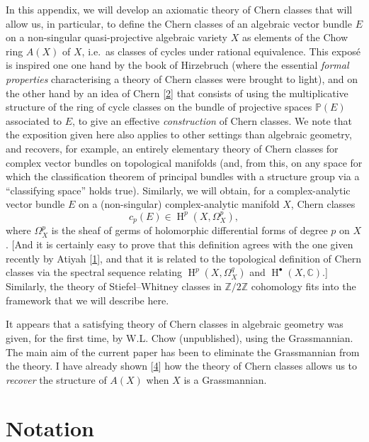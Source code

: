 \documentclass{article}
\newcommand{\oldpage}[1]{\marginpar{\footnotesize$\Big\vert$ \textit{p.~#1}}}
\begin{document}
In this appendix, we will develop an axiomatic theory of Chern classes that will allow us, in particular, to define the Chern classes of an algebraic vector bundle \(E\) on a non-singular quasi-projective algebraic variety \(X\) as elements of the Chow ring \(A(X)\) of \(X\), i.e.~as classes of cycles under rational equivalence.
This exposé is inspired one one hand by the book of Hirzebruch (where the essential \emph{formal properties} characterising a theory of Chern classes were brought to light), and on the other hand by an idea of Chern {[}\protect\hyperlink{ref-2}{2}{]} that consists of using the multiplicative structure of the ring of cycle classes on the bundle of projective spaces \(\mathbb{P}(E)\) associated to \(E\), to give an effective \emph{construction} of Chern classes.
We note that the exposition given here also applies to other settings than algebraic geometry, and recovers, for example, an entirely elementary theory of Chern classes for complex vector bundles on topological manifolds (and, from this, on any space for which the classification theorem of principal bundles with a structure group via a ``classifying space'' holds true).
Similarly, we will obtain, for a complex-analytic vector bundle \(E\) on a (non-singular) complex-analytic manifold \(X\), Chern classes
\[
  c_p(E) \in \operatorname{H}^p(X,\Omega_X^p),
\]
where \(\Omega_X^p\) is the sheaf of germs of holomorphic differential forms of degree \(p\) on \(X\).
{[}And it is certainly easy to prove that this definition agrees with the one given recently by Atiyah {[}\protect\hyperlink{ref-1}{1}{]}, and that it is related to the topological definition of Chern classes via the spectral sequence relating \(\operatorname{H}^p(X,\Omega_X^q)\) and \(\operatorname{H}^\bullet(X,\mathbb{C})\).{]}
Similarly, the theory of Stiefel--Whitney classes in \(\mathbb{Z}/2\mathbb{Z}\) cohomology fits into the framework that we will describe here.

\oldpage{138}

It appears that a satisfying theory of Chern classes in algebraic geometry was given, for the first time, by W.L. Chow (unpublished), using the Grassmannian.
The main aim of the current paper has been to eliminate the Grassmannian from the theory.
I have already shown {[}\protect\hyperlink{ref-4}{4}{]} how the theory of Chern classes allows us to \emph{recover} the structure of \(A(X)\) when \(X\) is a Grassmannian.

\hypertarget{section-1}{%
\section{Notation}\label{section-1}}
\end{document}
